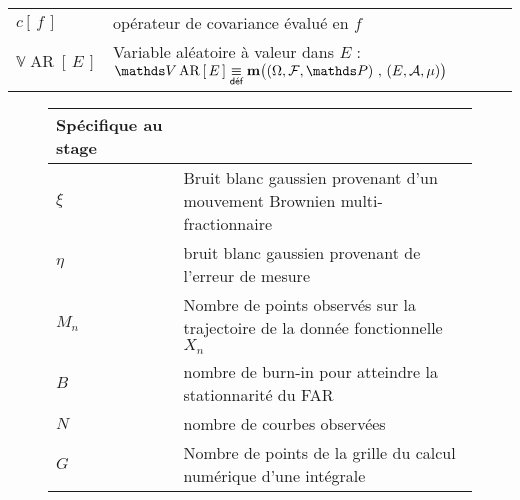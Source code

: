 \begin{tabularx}{\textwidth}{lX}
	$c\left[ \, f \, \right]$                                        & opérateur de covariance évalué en $f$                                                                                                                                                                      \\
	$\mathds V \operatorname{AR}\left[ \, E \,\right]$               & Variable aléatoire à valeur dans $E$ : $\mathds V \operatorname{AR}\left[ \, E \,\right] \isdef \mathbf m\bigl( \left(\Omega, \mathcal F, \mathds P\right) \, , \, \left(E, \mathcal A, \mu\right) \bigr)$ \\
	\bottomrule
\end{tabularx}


\begin{figure}[H]
\begin{tabularx}{\textwidth}{lX}
	\toprule
	\textbf{Spécifique au stage}                                                                                                                                                                                      \\
	\midrule
	$\xi$           & Bruit blanc gaussien provenant d'un mouvement Brownien multi-fractionnaire                                                                                                                      \\
	$\eta$          & bruit blanc gaussien provenant de l'erreur de mesure                                                                                                                                            \\
	\midrule
	$M_n$           & Nombre de points observés sur la trajectoire de la donnée fonctionnelle $X_n$                                                                                                                   \\
	$B$             & nombre de burn-in pour atteindre la stationnarité du FAR                                                                                                                                        \\
	$N$             & nombre de courbes observées                                                                                                                                                                     \\
	$G$             & Nombre de points de la grille du calcul numérique d'une intégrale                                                                                                                               \\

\end{tabularx}
\end{figure}

